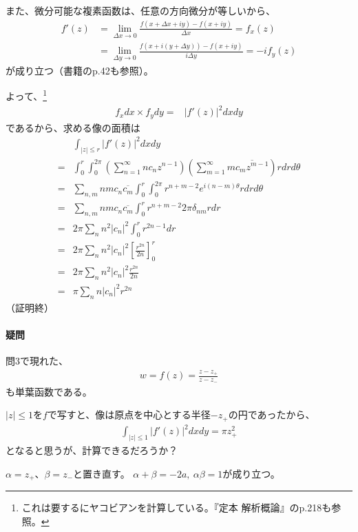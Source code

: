 また、微分可能な複素函数は、任意の方向微分が等しいから、
\begin{align*}
    f'(z)&=\lim_{\Delta x\to0}\frac{f(x+\Delta x+iy)-f(x+iy)}{\Delta x}=f_x(z)\\
    &=\lim_{\Delta y\to0}\frac{f(x+i(y+\Delta y))-f(x+iy)}{i\Delta y}=-if_y(z)
\end{align*}
が成り立つ（書籍のp.42も参照）。

よって、\footnote{これは要するにヤコビアンを計算している。『定本 解析概論』のp.218も参照。}
\begin{align*}
    f_xdx\times f_ydy
    =&|f'(z)|^2dxdy
\end{align*}
であるから、求める像の面積は
\begin{align*}
    &\int_{|z|\le r}|f'(z)|^2dxdy\\
    =&\int_{0}^{r}\int_{0}^{2\pi}\left(\sum_{n=1}^{\infty}nc_nz^{n-1}\right)\left(\sum_{m=1}^{\infty}m\overline{c_mz^{m-1}}\right)rdrd\theta\\
    =&\sum_{n,m}nmc_n\overline{c_m}\int_{0}^{r}
    \int_{0}^{2\pi}r^{n+m-2}e^{i(n-m)\theta}rdrd\theta\\
    =&\sum_{n,m}nmc_n\overline{c_m}\int_{0}^{r}
    r^{n+m-2}2\pi\delta_{nm}rdr\\
    =&2\pi\sum_{n}n^2|c_n|^2\int_{0}^{r}
    r^{2n-1}dr\\
    =&2\pi\sum_{n}n^2|c_n|^2\left[\frac{r^{2n}}{2n}\right]_0^r\\
    =&2\pi\sum_{n}n^2|c_n|^2\frac{r^{2n}}{2n}\\
    =&\pi\sum_{n}n|c_n|^2r^{2n}
\end{align*}
（証明終）

\paragraph{疑問}
問3で現れた、
\begin{align*}
    w=f(z)=\frac{z-z_+}{z-z_-}
\end{align*}
も単葉函数である。

$|z|\le1$を$f$で写すと、像は原点を中心とする半径$-z_+$の円であったから、
\begin{align*}
    \int_{|z|\le 1}|f'(z)|^2dxdy=\pi z_+^2
\end{align*}
となると思うが、計算できるだろうか？

$\alpha=z_+$、$\beta=z_-$と置き直す。
$\alpha+\beta=-2a,\ \alpha\beta=1$が成り立つ。

